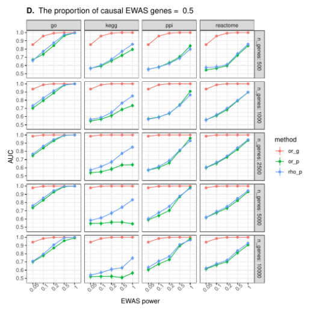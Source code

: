 \documentclass[11pt,oneside]{bristolthesis}
\begin{document}
\begin{center}\includegraphics[width=1\linewidth]{figure/06-ewas_gwas_comparison/method_test_gene_up_all/PEC_0.5} \end{center}
\end{document}
